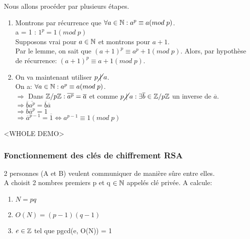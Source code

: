 \begin{demo}
Nous allons procéder par plusieurs étapes.\\

\begin{enumerate}
	\item Montrons par récurrence que $\forall a \in \mathbb{N}: a^p \equiv a(mod\;p)$.\\
	a = 1 : $1^p = 1(mod\;p)$\\
	Supposons vrai pour $a \in \mathbb{N}$ et montrons pour $a+1$.\\
	Par le lemme, on sait que $(a+1)^p \equiv a^p + 1(mod\;p)$. Alors, par hypothèse de récurrence: $(a+1)^p \equiv a + 1(mod\;p)$.\\
	\item On va maintenant utiliser $p\cancel{\;|\;}a$.\\
	On a: $\forall a \in \mathbb{N}: a^p \equiv a(mod\;p)$.\\
	$\Rightarrow$ Dans $\mathbb{Z}/p\mathbb{Z}: \overline{a^p}=\overline{a}$ et comme $p\cancel{\;|\;}a: \exists \overline{b} \in \mathbb{Z}/p\mathbb{Z}$ un inverse de $\overline{a}$.\\
	$\Rightarrow \overline{b}\overline{a^p} = \overline{b}\overline{a}$\\
	$\Rightarrow \overline{b}\overline{a}^p = \overline{1}$\\
	$\Rightarrow \overline{a}^{p-1} = \overline{1} \Leftrightarrow a^{p-1} \equiv 1(mod\;p)$\\ 

\end{enumerate}
\end{demo}

\begin{demo} [du Lemme]
<WHOLE DEMO>
\end{demo}

\subsubsection{Fonctionnement des clés de chiffrement RSA}

2 personnes (A et B) veulent communiquer de manière sûre entre elles.\\

A choisit 2 nombres premiers p et q $\in \mathbb{N}$ appelés clé privée. A calcule:\\

\begin{enumerate}
\item $N = pq$
\item $O(N) = (p-1)(q-1)$
\item $e \in \mathbb{Z}$ tel que pgcd(e, O(N)) = 1
\end{enumerate}

